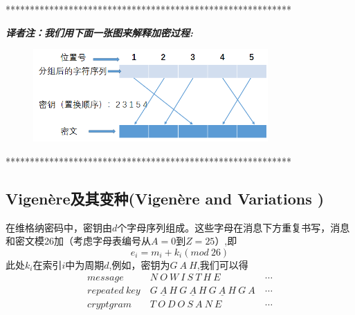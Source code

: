\documentclass[]{article}
\begin{document}
\vspace{1cm}
***********************************************************\par
\textsl{\textbf{译者注：我们用下面一张图来解释加密过程:}}\par
	\begin{figure}[htb]
		\includegraphics[width=0.8\textwidth]{transpostion-fixedp.png}
	\end{figure}
\par
***********************************************************\par
\vspace{1cm}

\subsection{Vigen\`{e}re及其变种(Vigen\`{e}re and Variations )}
在维格纳密码中，密钥由$d$个字母序列组成。这些字母在消息下方重复书写，消息和密文模26加（考虑字母表编号从$A=0到Z=25$）,即
\[ e_i = m_i+k_i(mod\ 26) \]
此处$k_i$在索引$i$中为周期$d$,例如，密钥为$G\ A\ H$,我们可以得
\begin{equation}
	\begin{aligned}
	message\ &N\ O\ W\ I\ S\ T\ H\ E\ &\cdots\\
	repeated\ key\ &\underline{G\ A\ H}\ \underline{G\ A\ H}\ \underline{G\ A\ H}\ G\ A\ &\cdots\\
	cryptgram\ &T\ O\ D\ O\ S\ A\ N\ E\ &\cdots\nonumber
	\end{aligned}
\end{equation}
\end{document}

